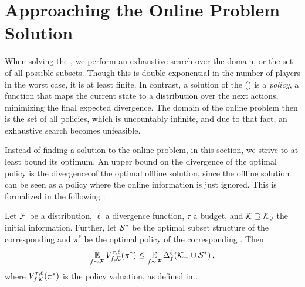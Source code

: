 \section{Approaching the Online Problem Solution}

When solving the , we perform an exhaustive search over the domain, or the set of all possible subsets.
Though this is double-exponential in the number of players in the worst case, it is at least finite.
In contrast, a solution of the  () is a \emph{policy}, a function that maps the current state to a distribution over the next actions, minimizing the final expected divergence.
The domain of the online problem then is the set of all policies, which is uncountably infinite, and due to that fact, an exhaustive search becomes unfeasible.

Instead of finding a solution to the online problem, in this section, we strive to at least bound its optimum.
An upper bound on the divergence of the optimal policy is the divergence of the optimal offline solution, since the offline solution can be seen as a policy where the online information is just ignored.
This is formalized in the following .

\begin{prop}
  \label{thm:online-bound-offline}
  Let $ \mathcal{F} $ be a distribution, $ \ell $ a divergence function, $ \tau $ a budget, and $ \mathcal{K} \supseteq \mathcal{K}_0 $ the initial information.
  Further, let $ \mathcal{S}^* $ be the optimal subset structure of the corresponding  and $ \pi^* $ be the optimal policy of the corresponding .
  Then \[
    \operatorname*{\mathbb{E}}_{f \sim \mathcal{F}} V^{\tau,\ell}_{f,\mathcal{K}}\!\left(\pi^*\right) \leq \operatorname*{\mathbb{E}}_{f \sim \mathcal{F}} \Delta_{f}^{\ell}\!\left(\mathcal{K}_- \cup \mathcal{S}^*\right),
  \]
  where $ V^{\tau,\ell}_{f,\mathcal{K}}\!\left(\pi^*\right) $ is the policy valuation, as defined in .
\end{prop}

